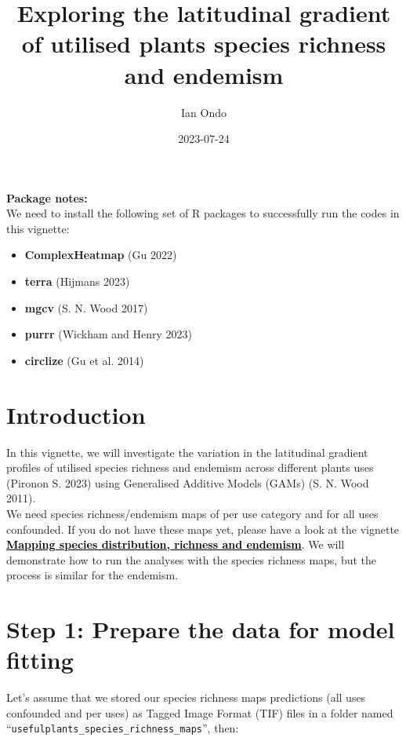 \documentclass[
]{article}
\title{Exploring the latitudinal gradient of utilised plants species
richness and endemism}
\author{Ian Ondo}
\date{2023-07-24}
\providecommand{\tightlist}{%
  \setlength{\itemsep}{0pt}\setlength{\parskip}{0pt}}
\begin{document}
\maketitle

{
\setcounter{tocdepth}{2}
\tableofcontents
}
\begin{warningbox}

\textbf{Package notes:}\\
We need to install the following set of R packages to successfully run
the codes in this vignette:

\begin{itemize}
\tightlist
\item
  \textbf{ComplexHeatmap} (Gu 2022)
\item
  \textbf{terra} (Hijmans 2023)
\item
  \textbf{mgcv} (S. N. Wood 2017)
\item
  \textbf{purrr} (Wickham and Henry 2023)
\item
  \textbf{circlize} (Gu et al. 2014)
\end{itemize}

\end{warningbox}

\hypertarget{introduction}{%
\section{Introduction}\label{introduction}}

In this vignette, we will investigate the variation in the latitudinal
gradient profiles of utilised species richness and endemism across
different plants uses (Pironon S. 2023) using Generalised Additive
Models (GAMs) (S. N. Wood 2011).\\
We need species richness/endemism maps of per use category and for all
uses confounded. If you do not have these maps yet, please have a look
at the vignette
\href{}{\textbf{\textcolor{black}{\underline{Mapping species distribution, richness and endemism}}}}.
We will demonstrate how to run the analyses with the species richness
maps, but the process is similar for the endemism.

\hypertarget{step-1-prepare-the-data-for-model-fitting}{%
\section{Step 1: Prepare the data for model
fitting}\label{step-1-prepare-the-data-for-model-fitting}}

Let's assume that we stored our species richness maps predictions (all
uses confounded and per uses) as Tagged Image Format (TIF) files in a
folder named ``\texttt{usefulplants\_species\_richness\_maps}'', then:
\end{document}
